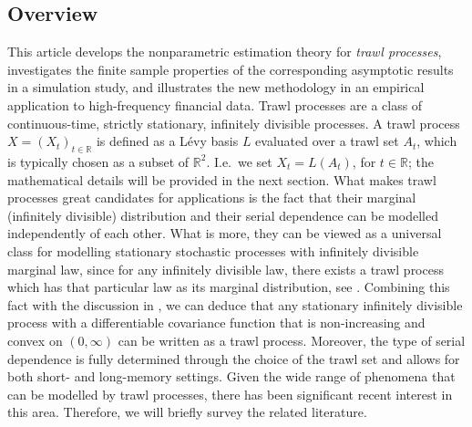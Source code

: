 \documentclass{article}
\theoremstyle{plain}
\theoremstyle{definition}
\theoremstyle{remark}
\begin{document}
\subsection{Overview}
This article develops the nonparametric estimation theory for \emph{trawl processes},
investigates the finite sample properties of the corresponding asymptotic results in a simulation study, and illustrates the new methodology in an empirical application to high-frequency financial data.
Trawl processes  are a class of 	
continuous-time, strictly stationary, infinitely divisible processes. 
A trawl process $X=(X_t)_{t\in \mathbb{R}}$ is  defined as a L\'{e}vy basis $L$ evaluated over a trawl set $A_t$, which is typically chosen as a subset of $\mathbb{R}^2$. I.e.~we set $X_t=L(A_t)$, for $t\in \mathbb{R}$; the mathematical details will be provided in the next section. 
What makes trawl processes great candidates for applications is the fact that their marginal (infinitely divisible) distribution and their serial dependence can be modelled independently of each other. 
What is more, they can be viewed as a universal class for modelling stationary stochastic processes with infinitely divisible marginal law, since for any infinitely divisible law, there exists a trawl process which has that particular law as its marginal distribution, see  \citet[p.~1535]{BN2011}. Combining this fact with the discussion in  	\citet[p.~1527]{WolpertTaqqu2005},  we can deduce that any stationary infinitely divisible process with a differentiable covariance function that is non-increasing and convex on $(0, \infty)$ can be written as a trawl process.
Moreover, the type of serial dependence is fully determined through the choice of the trawl set and allows for both short- and long-memory settings. 
Given the wide range of phenomena that can be modelled by trawl processes, there has been significant recent interest in this area. Therefore, we will briefly survey the related literature. 
\end{document}
